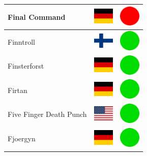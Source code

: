 \documentclass[12pt, a4paper, twoside]{report}
\begin{document}
\begin{center}
\begin{longtable}{|p{5cm}|p{2cm}|p{2cm}|}
 Final Command                                              & \includegraphics[width=1cm]{../img/flags/de} &   \includegraphics[width=1cm]{../likes/n} \\ \hline
 Finntroll                                                  & \includegraphics[width=1cm]{../img/flags/fi} &   \includegraphics[width=1cm]{../likes/y} \\ \hline
 Finsterforst                                               & \includegraphics[width=1cm]{../img/flags/de} &   \includegraphics[width=1cm]{../likes/y} \\ \hline
 Firtan                                                     & \includegraphics[width=1cm]{../img/flags/de} &   \includegraphics[width=1cm]{../likes/y} \\ \hline
 Five Finger Death Punch                                    & \includegraphics[width=1cm]{../img/flags/us} &   \includegraphics[width=1cm]{../likes/y} \\ \hline
 Fjoergyn                                                   & \includegraphics[width=1cm]{../img/flags/de} &   \includegraphics[width=1cm]{../likes/y} \\ \hline

\end{longtable}
\end{center}
\end{document}
